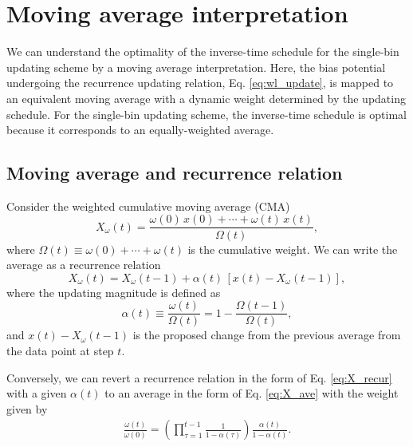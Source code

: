 \documentclass[reprint, superscriptaddress, floatfix]{revtex4-1}
\begin{document}
\appendix




\section{\label{sec:equilerr}
Moving average interpretation
}



We can understand
the optimality of the inverse-time schedule
for the single-bin updating scheme
by a moving average interpretation.
%
Here, the bias potential undergoing
the recurrence updating relation,
Eq. \eqref{eq:wl_update},
is mapped to an equivalent moving average
with a dynamic weight
determined by the updating schedule.
%
For the single-bin updating scheme,
the inverse-time schedule is optimal
because it corresponds to an equally-weighted average.


\subsection{Moving average and recurrence relation}

Consider the weighted cumulative moving average (CMA)
%
\begin{equation}
  X_\omega(t)
  =
  \frac{
    \omega(0) \, x(0) + \cdots + \omega(t) \, x(t)
  }
  {
    \Omega(t)
  }
  ,
  \label{eq:X_ave}
\end{equation}
%
where
$\Omega(t) \equiv \omega(0) + \cdots + \omega(t)$
is the cumulative weight.
%
We can write the average as a recurrence relation
%
\begin{equation}
  X_\omega(t)
  = X_\omega(t-1)
  +
  \alpha(t)
  \, [ x(t) - X_\omega(t-1) ]
  ,
  \label{eq:X_recur}
\end{equation}
%
where the updating magnitude is defined as
%
\begin{equation}
  \alpha(t) \equiv
  \frac{ \omega(t) } {\Omega(t)}
  =
  1 - \frac{ \Omega(t-1) } {\Omega(t)}
  ,
  \label{eq:alpha_from_Omega}
\end{equation}
%
and $x(t) - X_\omega(t-1)$
is the proposed change from the previous average
from the data point at step $t$.

Conversely, we can revert a recurrence relation
in the form of Eq. \eqref{eq:X_recur}
with a given $\alpha(t)$
to an average in the form of Eq. \eqref{eq:X_ave}
with the weight given by
\begin{align}
  \frac{ \omega(t) } { \omega(0) }
  =
  \left(
    \prod_{\tau=1}^{t-1} \frac{1}{1- \alpha(\tau)}
  \right)
  \frac{ \alpha(t) } { 1 - \alpha(t) }
  .
  \label{eq:omega_from_alpha}
\end{align}
\end{document}
